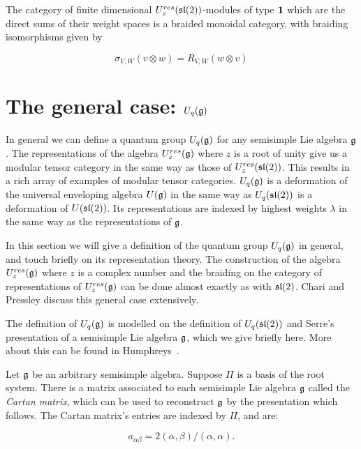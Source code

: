 \begin{theorem}
\label{theorem:Braiding}
The category of finite dimensional $U_z^{res}(\mathfrak{sl}(2))$-modules of type
$\mathbf{1}$ which are the direct sums of their weight spaces is a braided
monoidal category, with braiding isomorphisms given by 

\begin{equation}
\sigma_{V,W}(v \otimes w) = R_{V,W}(w \otimes v)
\end{equation}
\end{theorem}


\section{The general case: $U_q(\mathfrak{g})$}
\label{section:U_q(g)}


In general we can define a quantum group $U_q(\mathfrak{g})$ for any semisimple Lie
algebra $\mathfrak{g}$. The representations of the algebra $U_z^{res}(\mathfrak{g})$
where $z$ is a root of unity give us a modular tensor category in the same way
as those of $U_z^{res}(\mathfrak{sl}(2))$. This results in a rich array of examples of
modular tensor categories. $U_q(\mathfrak{g})$ is a deformation of the
universal enveloping algebra $U(\mathfrak{g})$ in the same way as $U_q(\mathfrak{sl}(2))$ is a
deformation of $U(\mathfrak{sl}(2))$. Its representations are indexed by highest weights
$\lambda$ in the same way as the representations of $\mathfrak{g}$. 

In this section we will give a definition of the quantum group $U_q(\mathfrak{g})$ in
general, and touch briefly on its representation theory. The construction of
the algebra $U_z^{res}(\mathfrak{g})$ where $z$ is a complex number and the braiding
on the category of representations of $U_z^{res}(\mathfrak{g})$ can be done almost
exactly as with $\mathfrak{sl}(2)$. Chari and Pressley \cite{CP} discuss this general
case extensively. 

The definition of $U_q(\mathfrak{g})$ is modelled on the definition of $U_q(\mathfrak{sl}(2))$
and Serre's presentation of a semisimple Lie algebra $\mathfrak{g}$, which we give
briefly here. More about this can be found in Humphreys~\cite{Humphreys1973}.

Let $\mathfrak{g}$ be an arbitrary semisimple algebra. Suppose $\Pi$ is a basis of
the root system. There is a matrix associated to each semisimple Lie algebra
$\mathfrak{g}$ called the \emph{Cartan matrix}, which can be used to reconstruct
$\mathfrak{g}$ by the presentation which follows. The Cartan matrix's entries are
indexed by $\Pi$, and are:

    \begin{equation}
        a_{\alpha\beta} = 2(\alpha, \beta) / (\alpha, \alpha).
    \end{equation}

